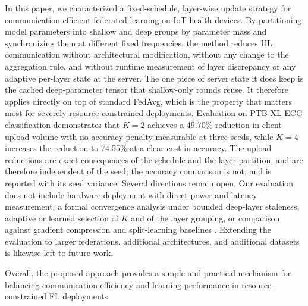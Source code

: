 \documentclass[10pt,conference]{IEEEtran}
\begin{document}
In this paper, we characterized a fixed-schedule, layer-wise update strategy for communication-efficient federated learning on IoT health devices. By partitioning model parameters into shallow and deep groups by parameter mass and synchronizing them at different fixed frequencies, the method reduces UL communication without architectural modification, without any change to the aggregation rule, and without runtime measurement of layer discrepancy or any adaptive per-layer state at the server. The one piece of server state it does keep is the cached deep-parameter tensor that shallow-only rounds reuse. It therefore applies directly on top of standard FedAvg, which is the property that matters most for severely resource-constrained deployments. Evaluation on PTB-XL ECG classification demonstrates that $K=2$ achieves a 49.70\% reduction in client upload volume with no accuracy penalty measurable at three seeds, while $K=4$ increases the reduction to 74.55\% at a clear cost in accuracy. The upload reductions are exact consequences of the schedule and the layer partition, and are therefore independent of the seed; the accuracy comparison is not, and is reported with its seed variance. Several directions remain open. Our evaluation does not include hardware deployment with direct power and latency measurement, a formal convergence analysis under bounded deep-layer staleness, adaptive or learned selection of $K$ and of the layer grouping, or comparison against gradient compression and split-learning baselines \cite{vepakomma2018}. Extending the evaluation to larger federations, additional architectures, and additional datasets is likewise left to future work.

Overall, the proposed approach provides a simple and practical mechanism for balancing communication efficiency and learning performance in resource-constrained FL deployments.





\end{document}
